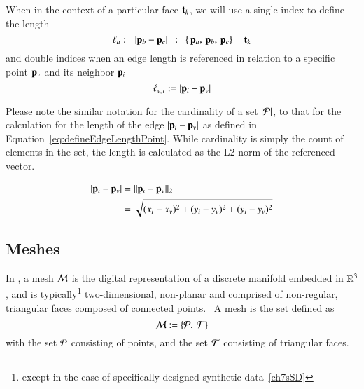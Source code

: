 {{When in the context of a particular face $\mathbf{t}_k$, we will use a single index to define the length
%
\begin{equation}
	\ell_a := |\mathbf{p}_b - \mathbf{p}_c| \enspace:\enspace \left \{\,\mathbf{p}_a,\,\mathbf{p}_b,\,\mathbf{p}_c\right \} = \mathbf{t}_k
	\label{eq:defineEdgeLengthFace}
\end{equation}%
%
%
and double indices when an edge length is referenced in relation to a specific point $\mathbf{p}_v$ and its neighbor $\mathbf{p}_i$
%
\begin{equation}
	\ell_{v,\kern.75pt i} := |\mathbf{p}_i - \mathbf{p}_v|
	\label{eq:defineEdgeLengthPoint}
\end{equation}%
%

Please note the similar notation for the cardinality of a set $|\mathcal{P}|$, to that for the calculation for the length of the edge $|\mathbf{p}_i - \mathbf{p}_v|$ as defined in Equation~\ref{eq:defineEdgeLengthPoint}. While cardinality is simply the count of elements in the set, the length is calculated as the L2-norm of the referenced vector.~\cite[p.~26]{Mara12}

\begin{equation}
\begin{aligned}
	|\mathbf{p}_i - \mathbf{p}_v| & = \lVert\mathbf{p}_i - \mathbf{p}_v\rVert_2 \\
					& = \sqrt{(x_i-x_v)^2 + (y_i-y_v)^2 + (y_i-y_v)^2}
	\label{eq:defineEdgeLengthCalc}
\end{aligned}
\end{equation}

%
%
%
%
\subsection{Meshes}
\label{ch2s3ssM}
In \tdd{}, a mesh $\mathcal{M}$ is the digital representation of a discrete manifold embedded in $\mathbb{R}^{3}$, and is typically\footnote{except in the case of specifically designed synthetic data~\ref{ch7sSD}} two-dimensional, non-planar and comprised of non-regular, triangular faces composed of connected points.~\cite[p.~25]{Mara12} A mesh is the set defined as
%
\begin{equation}
	\mathcal{M} := \left \{\mathcal{P},\:\mathcal{T}\right \}
	\label{eq:defineMesh}
\end{equation}%
%
%
with the set $\mathcal{P}$ consisting of points, and the set $\mathcal{T}$ consisting of triangular faces.

}}
